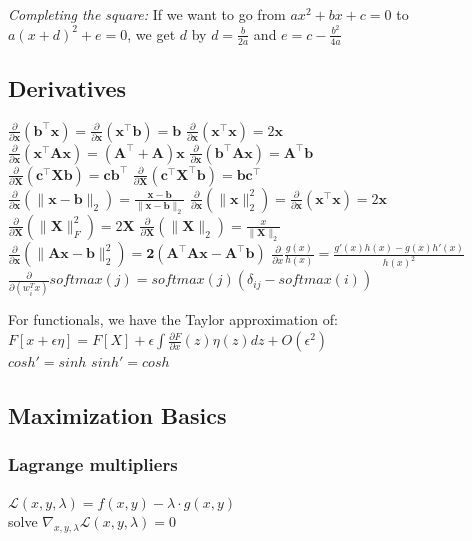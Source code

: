 \documentclass[9pt,parskip]{scrartcl}
\begin{document}
\begin{multicols*}{4}
\textit{Completing the square: }
If we want to go from $ax^2 + bx + c = 0$ to $a(x+d)^2 + e = 0$, 
we get $d$ by $d = \frac{b}{2a}$ and $e = c - \frac{b^2}{4a}$
\subsection*{Derivatives}
$\frac{\partial}{\partial \mathbf{x}}(\mathbf{b}^\top \mathbf{x}) = \frac{\partial}{\partial \mathbf{x}}(\mathbf{x}^\top \mathbf{b}) = \mathbf{b}$ \quad
$\frac{\partial}{\partial \mathbf{x}}(\mathbf{x}^\top \mathbf{x}) = 2\mathbf{x}$\\
$\frac{\partial}{\partial \mathbf{x}}(\mathbf{x}^\top \mathbf{A}\mathbf{x}) = (\mathbf{A}^\top + \mathbf{A})\mathbf{x}$ \quad
$\frac{\partial}{\partial \mathbf{x}}(\mathbf{b}^\top \mathbf{A}\mathbf{x}) = \mathbf{A}^\top \mathbf{b}$\\
$\frac{\partial}{\partial \mathbf{X}}(\mathbf{c}^\top \mathbf{X} \mathbf{b}) = \mathbf{c}\mathbf{b}^\top$ \quad
$\frac{\partial}{\partial \mathbf{X}}(\mathbf{c}^\top \mathbf{X}^\top \mathbf{b}) = \mathbf{b}\mathbf{c}^\top$\\
$\frac{\partial}{\partial \mathbf{x}}(\| \mathbf{x}-\mathbf{b} \|_2) = \frac{\mathbf{x}-\mathbf{b}}{\|\mathbf{x}-\mathbf{b}\|_2}$ \quad
$\frac{\partial}{\partial \mathbf{x}}(\|\mathbf{x}\|^2_2) = \frac{\partial}{\partial \mathbf{x}} (\mathbf{x}^\top \mathbf{x}) = 2\mathbf{x}$\\
$\frac{\partial}{\partial \mathbf{X}}(\|\mathbf{X}\|_F^2) = 2\mathbf{X}$ \quad
$\frac{\partial}{\partial \mathbf{X}}(\|\mathbf{X}\|_2) = \frac{x}{\|\mathbf{X}\|_2}$ \\ 

$\frac{\partial}{\partial \mathbf{x}}(\|\mathbf{Ax - b}\|_2^2) = \mathbf{2(A^\top Ax-A^\top b)}$
$\frac{\partial}{\partial x}\frac{g(x)}{h(x)} = \frac{g'(x)h(x) - g(x)h'(x)}{h(x)^2}$\\
$\frac{\partial}{\partial(w_i^Tx)}softmax(j)= softmax(j)(\delta_{ij} - softmax(i))$

For functionals, we have the Taylor approximation of: $F[x + \epsilon \eta] = F[X] + \epsilon \int \frac{\partial F}{\partial x}(z) \eta (z) dz + O(\epsilon ^2)$ \\
$cosh' = sinh$
$sinh' = cosh$

\subsection*{Maximization Basics}
\subsubsection*{Lagrange multipliers}
$ {\mathcal {L}}(x,y,\lambda )=f(x,y)-\lambda \cdot g(x,y)$ \\
solve $\nabla _{x,y,\lambda }{\mathcal {L}}(x,y,\lambda )=0$

\end{multicols*}
\end{document}
